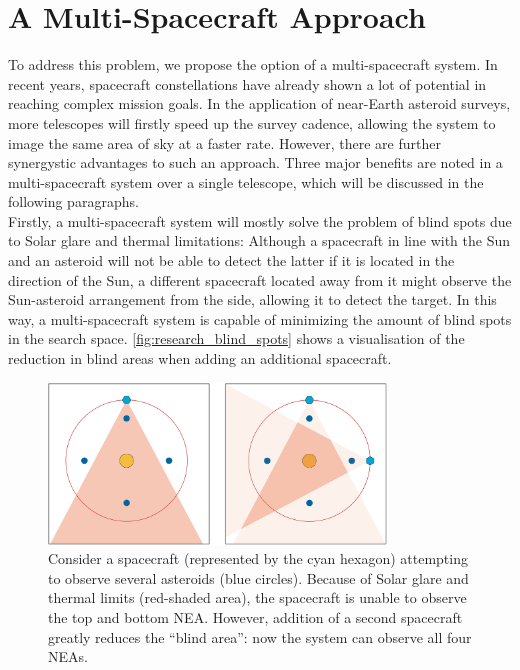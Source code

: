 \section{A Multi-Spacecraft Approach}
\label{sec:researchmultispacecraft}
To address this problem, we propose the option of a multi-spacecraft system. In recent years, spacecraft constellations have already shown a lot of potential in reaching complex mission goals. In the application of near-Earth asteroid surveys, more telescopes will firstly speed up the survey cadence, allowing the system to image the same area of sky at a faster rate. However, there are further synergystic advantages to such an approach. Three major benefits are noted in a multi-spacecraft system over a single telescope, which will be discussed in the following paragraphs.\\

Firstly, a multi-spacecraft system will mostly solve the problem of blind spots due to Solar glare and thermal limitations: Although a spacecraft in line with the Sun and an asteroid will not be able to detect the latter if it is located in the direction of the Sun, a different spacecraft located away from it might observe the Sun-asteroid arrangement from the side, allowing it to detect the target. In this way, a multi-spacecraft system is capable of minimizing the amount of blind spots in the search space. \autoref{fig:research_blind_spots} shows a visualisation of the reduction in blind areas when adding an additional spacecraft.\\

\begin{figure}[htbp]
 \centering
 \includegraphics[width=0.8\textwidth]{img/research_blind_spots.png}
 \caption{Consider a spacecraft (represented by the cyan hexagon) attempting to observe several asteroids (blue circles). Because of Solar glare and thermal limits (red-shaded area), the spacecraft is unable to observe the top and bottom NEA. However, addition of a second spacecraft greatly reduces the ``blind area'': now the system can observe all four NEAs.}
 \label{fig:research_blind_spots}
\end{figure}


